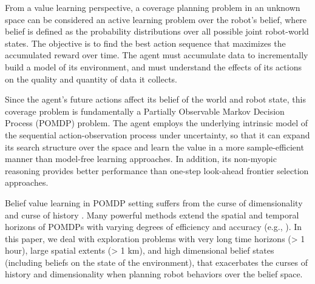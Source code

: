 \documentclass[letterpaper]{article} %
\newcommand{\phdone}[1]{} %
\begin{document}


From a value learning perspective, a coverage planning problem in an unknown space can be considered an active learning problem over the robot's belief, where belief is defined as the probability distributions over all possible joint robot-world states.
%
The objective is to find the best action sequence that maximizes the accumulated reward over time.  The agent must accumulate data to incrementally build a model of its environment, and must understand the effects of its actions on the quality and quantity of data it collects.

\phdone{Problem description--POMDP perspective}
Since the agent's future actions affect its belief of the world and robot state, this coverage problem is fundamentally a Partially Observable Markov Decision Process (POMDP) problem.
The agent employs the underlying intrinsic model of the sequential action-observation process under uncertainty, so that it can %
expand its search structure over the space and learn the value in a more sample-efficient manner than model-free learning approaches.
In addition, its non-myopic reasoning provides better performance than one-step look-ahead frontier selection approaches.

\phdone{Gap in the state-of-the-art}
Belief value learning in POMDP setting suffers from the curse of dimensionality \cite{KLC98} and curse of history \cite{Pineau03}. Many powerful methods extend the spatial and temporal horizons of POMDPs with varying degrees of efficiency and accuracy (e.g., \cite{silver2010monte,somani2013despot,bonet1998learning,kim2019pomhdp}). In this paper, we deal with exploration problems with very long time horizons (> 1 hour), large spatial extents (> 1 km), and high dimensional belief states (including beliefs on the state of the environment), that exacerbates the curses of history and dimensionality when planning robot behaviors over the belief space.
%
\end{document}
